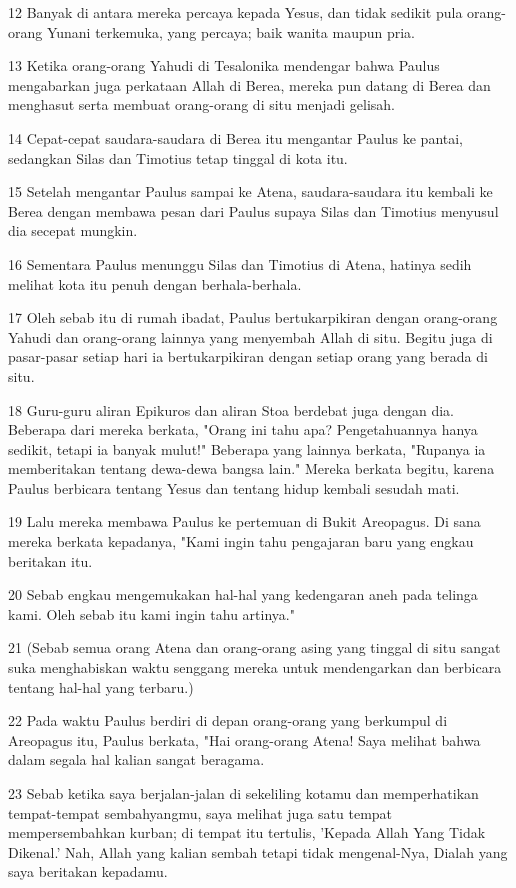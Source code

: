 \par 12 Banyak di antara mereka percaya kepada Yesus, dan tidak sedikit pula orang-orang Yunani terkemuka, yang percaya; baik wanita maupun pria.
\par 13 Ketika orang-orang Yahudi di Tesalonika mendengar bahwa Paulus mengabarkan juga perkataan Allah di Berea, mereka pun datang di Berea dan menghasut serta membuat orang-orang di situ menjadi gelisah.
\par 14 Cepat-cepat saudara-saudara di Berea itu mengantar Paulus ke pantai, sedangkan Silas dan Timotius tetap tinggal di kota itu.
\par 15 Setelah mengantar Paulus sampai ke Atena, saudara-saudara itu kembali ke Berea dengan membawa pesan dari Paulus supaya Silas dan Timotius menyusul dia secepat mungkin.
\par 16 Sementara Paulus menunggu Silas dan Timotius di Atena, hatinya sedih melihat kota itu penuh dengan berhala-berhala.
\par 17 Oleh sebab itu di rumah ibadat, Paulus bertukarpikiran dengan orang-orang Yahudi dan orang-orang lainnya yang menyembah Allah di situ. Begitu juga di pasar-pasar setiap hari ia bertukarpikiran dengan setiap orang yang berada di situ.
\par 18 Guru-guru aliran Epikuros dan aliran Stoa berdebat juga dengan dia. Beberapa dari mereka berkata, "Orang ini tahu apa? Pengetahuannya hanya sedikit, tetapi ia banyak mulut!" Beberapa yang lainnya berkata, "Rupanya ia memberitakan tentang dewa-dewa bangsa lain." Mereka berkata begitu, karena Paulus berbicara tentang Yesus dan tentang hidup kembali sesudah mati.
\par 19 Lalu mereka membawa Paulus ke pertemuan di Bukit Areopagus. Di sana mereka berkata kepadanya, "Kami ingin tahu pengajaran baru yang engkau beritakan itu.
\par 20 Sebab engkau mengemukakan hal-hal yang kedengaran aneh pada telinga kami. Oleh sebab itu kami ingin tahu artinya."
\par 21 (Sebab semua orang Atena dan orang-orang asing yang tinggal di situ sangat suka menghabiskan waktu senggang mereka untuk mendengarkan dan berbicara tentang hal-hal yang terbaru.)
\par 22 Pada waktu Paulus berdiri di depan orang-orang yang berkumpul di Areopagus itu, Paulus berkata, "Hai orang-orang Atena! Saya melihat bahwa dalam segala hal kalian sangat beragama.
\par 23 Sebab ketika saya berjalan-jalan di sekeliling kotamu dan memperhatikan tempat-tempat sembahyangmu, saya melihat juga satu tempat mempersembahkan kurban; di tempat itu tertulis, 'Kepada Allah Yang Tidak Dikenal.' Nah, Allah yang kalian sembah tetapi tidak mengenal-Nya, Dialah yang saya beritakan kepadamu.
